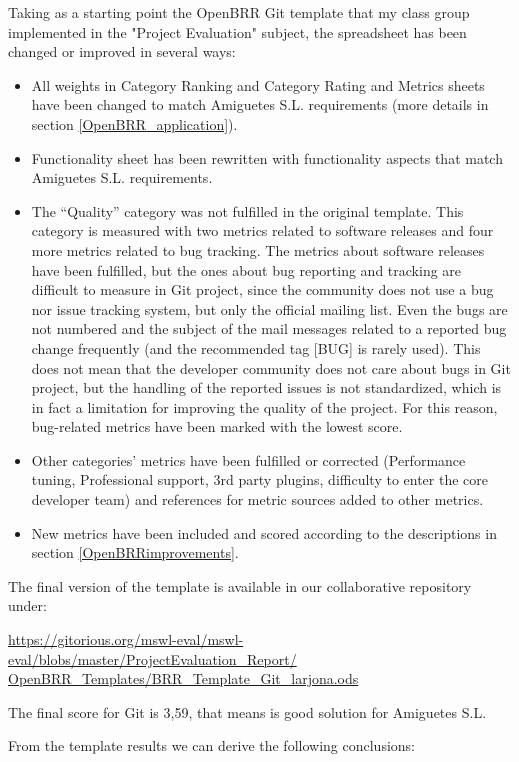 \documentclass[a4paper,10pt]{article}
\begin{document}
Taking as a starting point the OpenBRR Git template that my class group
implemented in the "Project Evaluation" subject, the spreadsheet has been
changed or improved in several ways:
\begin{itemize}
 \item All weights in Category Ranking and Category Rating and Metrics
sheets have been changed to match Amiguetes S.L. requirements (more details in
section \ref{OpenBRR_application}).
 \item Functionality sheet has been rewritten with functionality
aspects that match Amiguetes S.L. requirements.
 \item The ``Quality'' category was not fulfilled in the original template.
This category is measured with two metrics related to software releases and
four more metrics related to bug tracking. The metrics about software releases
have been fulfilled, but the ones about bug reporting and tracking are
difficult to measure in Git project, since the community does not use a bug nor
issue tracking system, but only the official mailing list. Even the bugs are
not numbered and the subject of the mail messages related to a reported bug
change frequently (and the recommended tag [BUG] is rarely used). This does not
mean that the developer community does not care about bugs in Git project, but
the handling of the reported issues is not standardized, which is in fact a
limitation for improving the quality of the project. For this reason,
bug-related metrics have been marked with the lowest score.
\item Other categories' metrics have been fulfilled or corrected
(Performance tuning, Professional support, 3rd party plugins, difficulty to
enter the core developer team) and references for metric sources added to other
metrics.
\item New metrics have been included and scored according to the descriptions
in section \ref{OpenBRRimprovements}.
\end{itemize}

The final version of the template is available in our collaborative repository
under:

\url{
https://gitorious.org/mswl-eval/mswl-eval/blobs/master/ProjectEvaluation_Report/
OpenBRR_Templates/BRR_Template_Git_larjona.ods}

The final score for Git is 3,59, that means is good solution for
Amiguetes S.L. 

From the template results we can derive the following conclusions:
\end{document}
